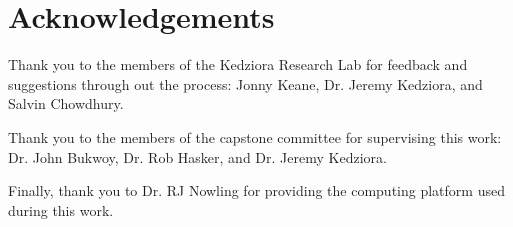 \documentclass[nohyperref]{article}
\theoremstyle{plain}
\theoremstyle{definition}
\theoremstyle{remark}
\begin{document}
\section*{Acknowledgements}

Thank you to the members of the Kedziora Research Lab for feedback and suggestions through out the process: Jonny Keane, Dr. Jeremy Kedziora, and Salvin Chowdhury.

Thank you to the members of the capstone committee for supervising this work: Dr. John Bukwoy, Dr. Rob Hasker, and Dr. Jeremy Kedziora.

Finally, thank you to Dr. RJ Nowling for providing the computing platform used during this work.

\nocite{langley00}






\end{document}
